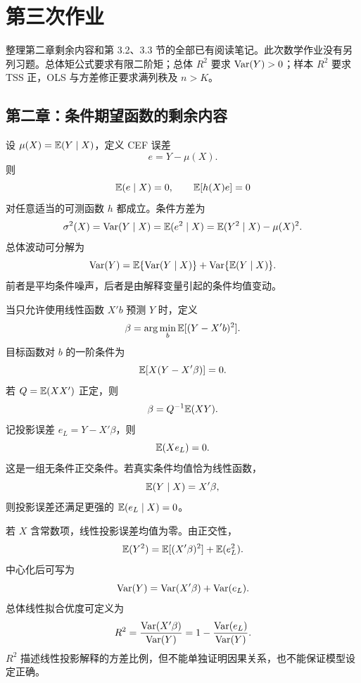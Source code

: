\section{第三次作业}\label{hw:reg:assignment:3}
\setlength{\abovedisplayskip}{6pt}
\setlength{\belowdisplayskip}{6pt}
\setlength{\abovedisplayshortskip}{4pt}
\setlength{\belowdisplayshortskip}{4pt}

整理第二章剩余内容和第 3.2、3.3 节的全部已有阅读笔记。此次数学作业没有另列习题。总体矩公式要求有限二阶矩；总体 $R^2$ 要求 $\operatorname{Var}(Y)>0$；样本 $R^2$ 要求 TSS 正，OLS 与方差修正要求满列秩及 $n>K$。

\subsection*{第二章：条件期望函数的剩余内容}

\begin{proposition}\label{hw:reg:note:3:1}
设 $\mu(X)=\mathbb{E}(Y\mid X)$，定义 CEF 误差
\[
e=Y-\mu(X).
\]
则
\[
\mathbb{E}(e\mid X)=0,\qquad \mathbb{E}[h(X)e]=0
\]
对任意适当的可测函数 $h$ 都成立。条件方差为
\[
\sigma^2(X)=\operatorname{Var}(Y\mid X)=\mathbb{E}(e^2\mid X)
=\mathbb{E}(Y^2\mid X)-\mu(X)^2.
\]
总体波动可分解为
\[
\operatorname{Var}(Y)=\mathbb{E}\{\operatorname{Var}(Y\mid X)\}
+\operatorname{Var}\{\mathbb{E}(Y\mid X)\}.
\]
前者是平均条件噪声，后者是由解释变量引起的条件均值变动。
\end{proposition}

\begin{proposition}\label{hw:reg:note:3:2}
当只允许使用线性函数 $X'b$ 预测 $Y$ 时，定义
\[
\beta=\arg\min_b\mathbb{E}[(Y-X'b)^2].
\]
目标函数对 $b$ 的一阶条件为
\[
\mathbb{E}[X(Y-X'\beta)]=0.
\]
若 $Q=\mathbb{E}(XX')$ 正定，则
\[
\beta=Q^{-1}\mathbb{E}(XY).
\]
记投影误差 $e_L=Y-X'\beta$，则
\[
\mathbb{E}(Xe_L)=0.
\]
这是一组无条件正交条件。若真实条件均值恰为线性函数，
\[
\mathbb{E}(Y\mid X)=X'\beta,
\]
则投影误差还满足更强的 $\mathbb{E}(e_L\mid X)=0$。
\end{proposition}

\begin{proposition}\label{hw:reg:note:3:3}
若 $X$ 含常数项，线性投影误差均值为零。由正交性，
\[
\mathbb{E}(Y^2)=\mathbb{E}[(X'\beta)^2]+\mathbb{E}(e_L^2).
\]
中心化后可写为
\[
\operatorname{Var}(Y)=\operatorname{Var}(X'\beta)+\operatorname{Var}(e_L).
\]
总体线性拟合优度可定义为
\[
R^2=\frac{\operatorname{Var}(X'\beta)}{\operatorname{Var}(Y)}
=1-\frac{\operatorname{Var}(e_L)}{\operatorname{Var}(Y)}.
\]
$R^2$ 描述线性投影解释的方差比例，但不能单独证明因果关系，也不能保证模型设定正确。
\end{proposition}

